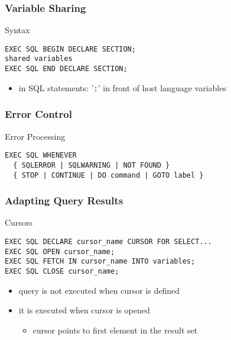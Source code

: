 \documentclass[dvipsnames]{beamer}
\theoremstyle{plain}
\begin{document}
\begin{frame}[fragile]
  \frametitle{Variable Sharing}

  \begin{block}{Syntax}
    \begin{lstlisting}[language=EmbeddedSQL]
EXEC SQL BEGIN DECLARE SECTION;
shared variables
EXEC SQL END DECLARE SECTION;
    \end{lstlisting}
  \end{block}

  \begin{itemize}
    \item in SQL statements: '\lstinline!:!' in front of host language variables
  \end{itemize}
\end{frame}

\begin{frame}[fragile]
  \frametitle{Error Control}

  \begin{block}{Error Processing}
    \begin{lstlisting}[language=EmbeddedSQL]
EXEC SQL WHENEVER
  { SQLERROR | SQLWARNING | NOT FOUND }
  { STOP | CONTINUE | DO command | GOTO label }
    \end{lstlisting}
  \end{block}
\end{frame}

\begin{frame}[fragile]
  \frametitle{Adapting Query Results}

  \begin{block}{Cursors}
    \begin{lstlisting}[language=EmbeddedSQL]
EXEC SQL DECLARE cursor_name CURSOR FOR SELECT...
EXEC SQL OPEN cursor_name;
EXEC SQL FETCH IN cursor_name INTO variables;
EXEC SQL CLOSE cursor_name;
    \end{lstlisting}
  \end{block}

  \pause
  \begin{itemize}
    \item query is not executed when cursor is defined
    \item it is executed when cursor is opened
    \begin{itemize}
      \item cursor points to first element in the result set
    \end{itemize}
  \end{itemize}
\end{frame}
\end{document}
